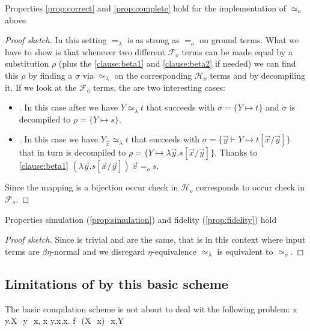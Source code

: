 \documentclass[sigconf,natbib=false,review]{acmart}
\newcommand{\appsep}{\ensuremath{\textcolor{lightgray}{\cdot}}}
\newcommand{\EqualRel}{\ensuremath{=}}
\newcommand{\UnifRel}{\ensuremath{\simeq}}
\newcommand{\Uo}{\ensuremath{\UnifRel_o}\xspace}
\newcommand{\Eo}{\ensuremath{\EqualRel_o}\xspace}
\newcommand{\Ue}{\ensuremath{\UnifRel_\lambda}\xspace}
\newcommand{\Ee}{\ensuremath{\EqualRel_\lambda}\xspace}
\newcommand{\Fo}{\ensuremath{\mathcal{F}_{\!o}\xspace}} %
\newcommand{\Ho}{\ensuremath{\mathcal{H}_o}\xspace}
\begin{document}
\begin{lemma}
Properties \ref{prop:correct} and
\ref{prop:complete} hold for the implementation of \Uo above
\end{lemma}
\begin{proof}[Proof sketch]
 In this setting \Ee is as strong as
\Eo on ground terms. What we have to show is that whenever two different \Fo
terms can be made equal by a substitution $\rho$ (plus the \ref{clause:beta1}
and \ref{clause:beta2} if needed) we can find this $\rho$ by finding
a $\sigma$ via \Ue{} on the corresponding \Ho terms and by decompiling it.
If we look at the \Fo{} terms, the are two interesting cases:
\begin{itemize}
\item \elpiIn{fuva X ~\Uo~s}. In this case after  we have
  $Y \Ue t$ that succeeds with $\sigma = \{ Y \mapsto t\}$ and
  $\sigma$ is decompiled to $\rho = \{ Y \mapsto s\}$.
\item \elpiIn{fapp[fuva X|L] ~\Uo~s}. In this case
 we have $Y_{\vec{x}} \Ue t$ that succeeds with
 $\sigma = \{ \vec{y} \vdash Y \mapsto t[\vec{x}/\vec{y}]\}$ that in turn
 is decompiled to $\rho = \{ Y \mapsto \lambda \vec{y}.s[\vec{x}/\vec{y}]\}$.
 Thanks to \ref{clause:beta1}
 $(\lambda \vec{y}.s[\vec{x}/\vec{y}])~\vec{x} \Eo s$.
\end{itemize}
Since the mapping is a bijection occur check in \Ho{} corresponds to occur
check in \Fo{}.
\end{proof}

\begin{lemma} Properties simulation (\ref{prop:simulation}) and
fidelity (\ref{prop:fidelity}) hold
\end{lemma}
\begin{proof}[Proof sketch]
Since  is trivial \fstep and \hstep are the same, that is
in this
context where input terms are $\beta\eta$-normal and we disregard $\eta$-equivalence
\Ue is equivalent to \Uo.
\end{proof}

\subsection{Limitations of by this basic scheme}
\label{sec:basic-comp-limitations}
The basic compilation scheme is not about to
deal wit the following problem:
\printAlll
  {{{\lambda x y.X \appsep y \appsep x, \lambda x y.x},{\lambda x. f \appsep (X \appsep x) \appsep x,Y}}}
  {{}}
  {{}}
  {{}}
\end{document}
